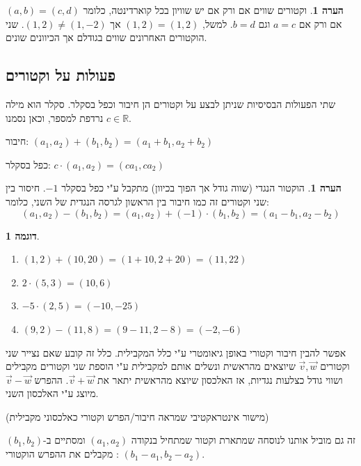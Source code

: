 \documentclass[12pt]{book}
\theoremstyle{plain}
\theoremstyle{definition}
\newtheorem{example}[theorem]{דוגמה}
\newtheorem{remark}[theorem]{הערה}
\newcommand{\R}{\mathbb{R}}
\begin{document}
\begin{remark}
וקטורים שווים אם ורק אם יש שוויון בכל קוארדינטה, כלומר \((a,b)=(c,d)\)
אם ורק אם \(a=c\) וגם \(b=d\). למשל,
\((1,2)=(1,2)\)
אך \((1,2)\neq(1,-2)\). שני הוקטורים האחרונים שווים בגודלם אך הכיוונים שונים.
\end{remark}

\subsection{פעולות על וקטורים}

שתי הפעולות הבסיסיות שניתן לבצע על וקטורים הן חיבור וכפל בסקלר. סקלר
הוא מילה נרדפת למספר, וכאן נסמנו \(c\in\R\).

חיבור: \((a_{1},a_{2})+(b_{1},b_{2})=(a_{1}+b_{1},a_{2}+b_{2})\)

כפל בסקלר: \(c\cdot(a_{1},a_{2})=(ca_{1},ca_{2})\) 

\begin{remark}
הוקטור הנגדי (שווה גודל אך הפוך בכיוון) מתקבל ע"י
כפל בסקלר \(-1\). חיסור בין שני וקטורים זה כמו חיבור בין הראשון
לגרסה הנגדית של השני, כלומר:
\begin{equation*}
	(a_{1},a_{2})-(b_{1},b_{2})=(a_{1},a_{2})+(-1)\cdot(b_{1},b_{2})=(a_{1}-b_{1},a_{2}-b_{2})
\end{equation*}
\end{remark}

\begin{example}\ 
\begin{enumerate}[label=\alph*.]
    \item \((1,2)+(10,20)=(1+10,2+20)=(11,22)\)
    \item \(2\cdot(5,3)=(10,6)\)
    \item \(-5\cdot(2,5)=(-10,-25)\)
    \item \((9,2)-(11,8)=(9-11,2-8)=(-2,-6)\)
\end{enumerate}
\end{example}

אפשר להבין חיבור וקטורי באופן גיאומטרי ע"י כלל המקבילית.
כלל זה קובע שאם נצייר שני וקטורים \(\vec{v},\vec{w}\) שיוצאים מהראשית
ונשלים אותם למקבילית ע"י הוספת שני וקטורים מקבילים
ושווי גודל כצלעות נגדיות, אז האלכסון שיוצא מהראשית יתאר את \(\vec{v}+\vec{w}\).
ההפרש \(\vec{v}-\vec{w}\) מיוצג ע"י האלכסון השני. 
\begin{center}
	(מישור אינטראקטיבי שמראה חיבור/הפרש וקטורי כאלכסוני מקבילית)
\end{center}

זה גם מוביל אותנו לנוסחה שמתארת וקטור שמתחיל בנקודה \((a_{1},a_{2})\)
ומסתיים ב-\((b_{1},b_{2})\): מקבלים את ההפרש הוקטורי \((b_{1}-a_{1},b_{2}-a_{2})\).
\end{document}
